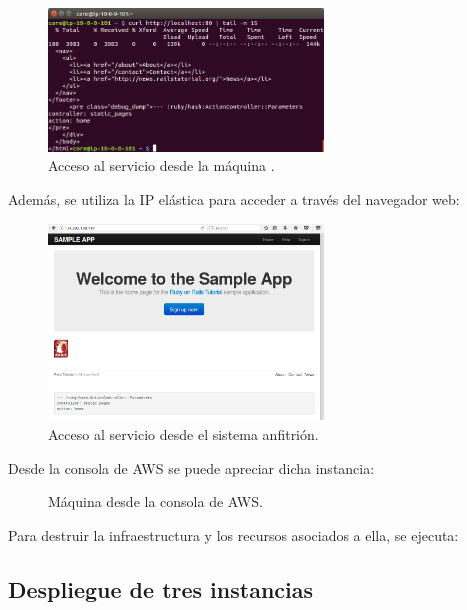 \begin{figure}[H]
\centering
\includegraphics[width=0.65\textwidth]{images/figures/curl-aws-1.png}
\caption{Acceso al servicio desde la máquina .}
\end{figure}

Además, se utiliza la IP elástica para acceder a través del navegador web:

\begin{figure}[H]
\centering
\includegraphics[width=0.65\textwidth]{images/figures/access-aws-1.png}
\caption{Acceso al servicio desde el sistema anfitrión.}
\end{figure}

Desde la consola de AWS se puede apreciar dicha instancia:

\begin{figure}[H]
\caption{Máquina  desde la consola de AWS.}
\end{figure}

Para destruir la infraestructura y los recursos asociados a ella, se ejecuta:


\subsection{Despliegue de tres instancias}

